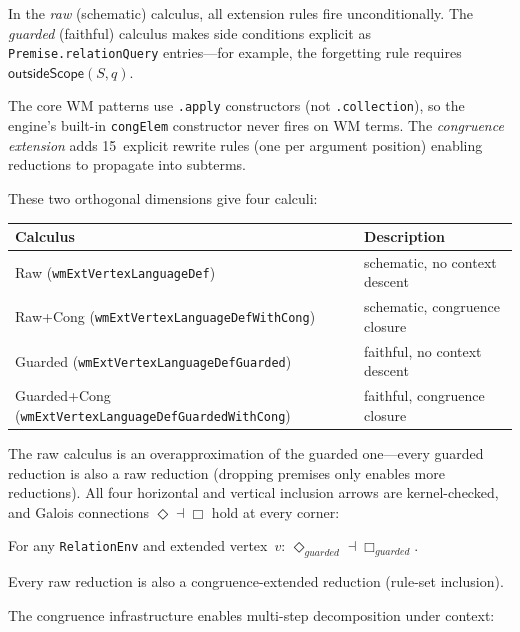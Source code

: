 \documentclass[11pt,openany]{report}
\begin{document}
In the \emph{raw} (schematic) calculus, all extension rules fire
unconditionally.  The \emph{guarded} (faithful) calculus makes side
conditions explicit as \texttt{Premise.relationQuery} entries---for example,
the forgetting rule requires $\mathsf{outsideScope}(S, q)$.

The core WM patterns use \texttt{.apply} constructors (not
\texttt{.collection}), so the engine's built-in \texttt{congElem}
constructor never fires on WM terms.  The \emph{congruence extension}
adds 15~explicit rewrite rules (one per argument position) enabling
reductions to propagate into subterms.

These two orthogonal dimensions give four calculi:

\begin{center}
\begin{tabular}{ll}
\toprule
\textbf{Calculus} & \textbf{Description} \\
\midrule
Raw (\texttt{wmExtVertexLanguageDef}) & schematic, no context descent \\
Raw+Cong (\texttt{wmExtVertexLanguageDefWithCong}) & schematic, congruence closure \\
Guarded (\texttt{wmExtVertexLanguageDefGuarded}) & faithful, no context descent \\
Guarded+Cong (\texttt{wmExtVertexLanguageDefGuardedWithCong}) & faithful, congruence closure \\
\bottomrule
\end{tabular}
\end{center}

The raw calculus is an overapproximation of the guarded one---every guarded
reduction is also a raw reduction (dropping premises only enables more
reductions).  All four horizontal and vertical inclusion arrows are
kernel-checked, and Galois connections $\Diamond \dashv \Box$ hold at every
corner:

\begin{theorem}
For any \texttt{RelationEnv} and extended vertex~$v$:
$\Diamond_{\mathit{guarded}} \dashv \Box_{\mathit{guarded}}$.
\end{theorem}

\begin{theorem}
Every raw reduction is also a congruence-extended reduction (rule-set
inclusion).
\end{theorem}

The congruence infrastructure enables multi-step decomposition under context:
\end{document}
